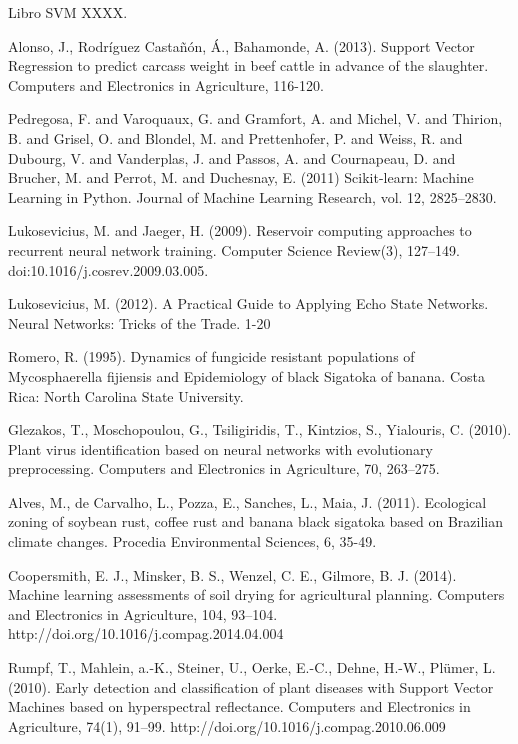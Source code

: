 \documentclass[review]{elsarticle}
\begin{document}
\begin{thebibliography}{1}
 Libro SVM XXXX.

 Alonso, J., Rodríguez Castañón, Á., Bahamonde, A. (2013). Support Vector Regression to predict carcass weight in beef cattle in advance of the slaughter. Computers and Electronics in Agriculture, 116-120.

 Pedregosa, F. and Varoquaux, G. and Gramfort, A. and Michel, V. and Thirion, B. and Grisel, O. and Blondel, M. and Prettenhofer, P. and Weiss, R. and Dubourg, V. and Vanderplas, J. and Passos, A. and Cournapeau, D. and Brucher, M. and Perrot, M. and Duchesnay, E. (2011) Scikit-learn: Machine Learning in Python. Journal of Machine Learning Research, vol. 12, 2825--2830.

 Lukosevicius, M. and Jaeger, H. (2009). Reservoir computing approaches to recurrent neural network training. Computer Science Review(3), 127–149. doi:10.1016/j.cosrev.2009.03.005.

 Lukosevicius, M. (2012). A Practical Guide to Applying Echo State Networks. Neural Networks: Tricks of the Trade. 1-20

  Romero, R. (1995). Dynamics of fungicide resistant populations of Mycosphaerella fijiensis and Epidemiology of black Sigatoka of banana. Costa Rica: North Carolina State University.

 Glezakos, T., Moschopoulou, G., Tsiligiridis, T., Kintzios, S., Yialouris, C. (2010). Plant virus identification based on neural networks with evolutionary preprocessing. Computers and Electronics in Agriculture, 70, 263–275.

 Alves, M., de Carvalho, L., Pozza, E., Sanches, L., Maia, J. (2011). Ecological zoning of soybean rust, coffee rust and banana black sigatoka based on Brazilian climate changes. Procedia Environmental Sciences, 6, 35-49.

 Coopersmith, E. J., Minsker, B. S., Wenzel, C. E., Gilmore, B. J. (2014). Machine learning assessments of soil drying for agricultural planning. Computers and Electronics in Agriculture, 104, 93–104. http://doi.org/10.1016/j.compag.2014.04.004

 Rumpf, T., Mahlein, a.-K., Steiner, U., Oerke, E.-C., Dehne, H.-W., Plümer, L. (2010). Early detection and classification of plant diseases with Support Vector Machines based on hyperspectral reflectance. Computers and Electronics in Agriculture, 74(1), 91–99. http://doi.org/10.1016/j.compag.2010.06.009


\end{thebibliography}
\end{document}
